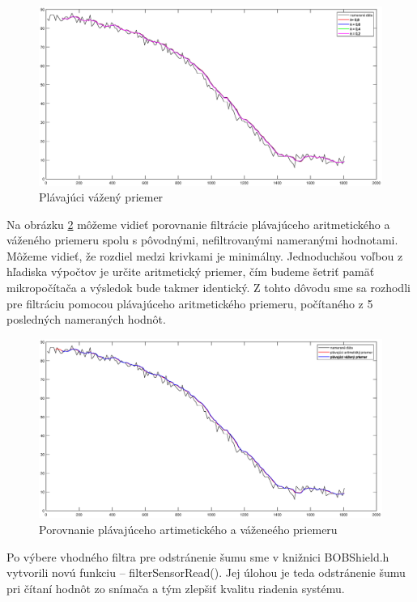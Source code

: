 \begin{figure}
	\centering
	\includegraphics[width=170mm]{obr/plavajuciVazeny.eps}
	\caption{Plávajúci vážený priemer}\label{OBRAZOK 3.1.1.3} 
\end{figure}


Na obrázku \ref{OBRAZOK 3.1.1.4} môžeme vidieť porovnanie filtrácie plávajúceho aritmetického a váženého priemeru spolu s pôvodnými, nefiltrovanými nameranými hodnotami. Môžeme vidieť, že rozdiel medzi krivkami je minimálny. Jednoduchšou voľbou z hľadiska výpočtov je určite aritmetický priemer, čím budeme šetriť pamäť mikropočítača a výsledok bude takmer identický. Z tohto dôvodu sme sa rozhodli pre filtráciu pomocou plávajúceho aritmetického priemeru, počítaného z 5 posledných nameraných hodnôt.  

\begin{figure}
	\centering
	\includegraphics[width=170mm]{obr/aritmetickyVSvazeny.eps}
	\caption{Porovnanie plávajúceho artimetického a váženeého priemeru}\label{OBRAZOK 3.1.1.4} 
\end{figure}

Po výbere vhodného filtra pre odstránenie šumu sme v knižnici BOBShield.h vytvorili novú funkciu – filterSensorRead(). Jej úlohou je teda odstránenie šumu pri čítaní hodnôt zo snímača a tým zlepšiť kvalitu riadenia systému.  

